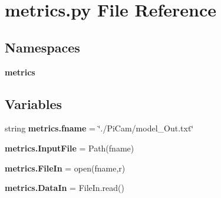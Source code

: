\section{metrics.\+py File Reference}
\label{metrics_8py}
\subsection*{Namespaces}
\begin{DoxyCompactItemize}
\item 
 \textbf{ metrics}
\end{DoxyCompactItemize}
\subsection*{Variables}
\begin{DoxyCompactItemize}
\item 
string \textbf{ metrics.\+fname} = \char`\"{}./Pi\+Cam/model\+\_\+\+Out.\+txt\char`\"{}
\item 
\textbf{ metrics.\+Input\+File} = Path(fname)
\item 
\textbf{ metrics.\+File\+In} = open(fname,\textquotesingle{}r\textquotesingle{})
\item 
\textbf{ metrics.\+Data\+In} = File\+In.\+read()
\end{DoxyCompactItemize}
